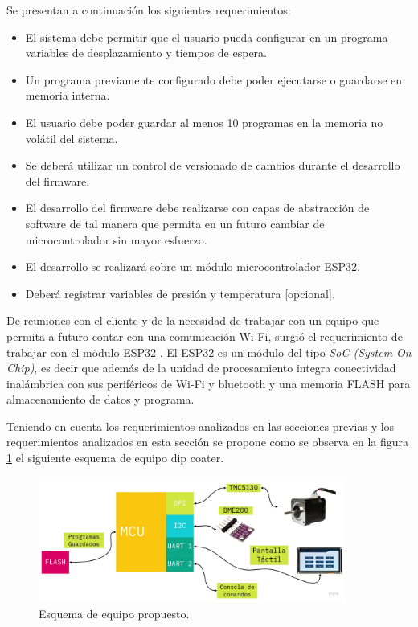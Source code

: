 Se presentan a continuación los siguientes requerimientos:
\begin{itemize}

\item El sistema debe permitir que el usuario pueda configurar en un programa variables de desplazamiento y tiempos de espera.
\item Un programa previamente configurado debe poder ejecutarse o guardarse en memoria interna.
\item El usuario debe poder guardar al menos 10 programas en la memoria no volátil del sistema.
\item Se deberá utilizar un control de versionado de cambios durante el desarrollo del firmware.
\item El desarrollo del firmware debe realizarse con capas de abstracción de software de tal manera que permita en un futuro cambiar de microcontrolador sin mayor esfuerzo.
\item El desarrollo se realizará sobre un módulo microcontrolador ESP32.
\item Deberá registrar variables de presión y temperatura [opcional].
\end{itemize}

De reuniones con el cliente y de la necesidad de trabajar con un equipo que permita a futuro contar con una comunicación Wi-Fi, surgió el requerimiento de trabajar con el módulo ESP32 \citep{web_esp}.
El ESP32 es un módulo del tipo \textit{SoC (System On Chip)}, es decir que además de la unidad de procesamiento integra conectividad inalámbrica con sus periféricos de Wi-Fi y bluetooth y una memoria FLASH para almacenamiento de datos y programa.
  

Teniendo en cuenta los requerimientos analizados en las secciones previas y los requerimientos analizados en esta sección se propone como se observa en la figura \ref{fig:equipo_propuesto} el siguiente esquema de equipo dip coater.  


\begin{figure}[ht]
\centering 
\includegraphics[width=0.9\textwidth]{./Figures/cap2_esquema_propuesto.jpg}
\caption{Esquema de equipo propuesto.}
\label{fig:equipo_propuesto}
\end{figure}

